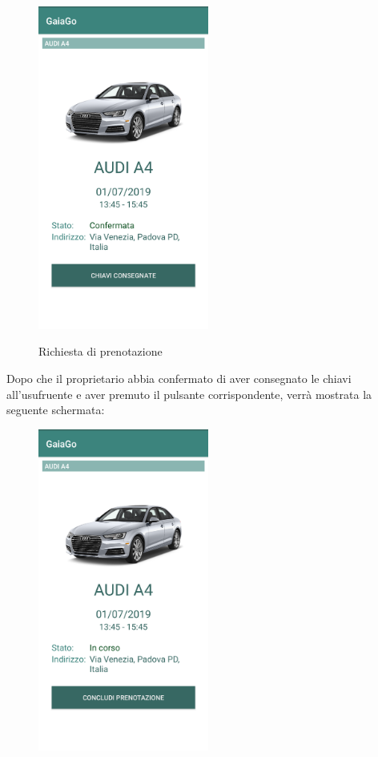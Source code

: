 \begin{itemize}
\begin{figure}[H]
		\includegraphics[width=0.5\textwidth]{res/images/chiavi_proprietario.png}\\
		\caption{Richiesta di prenotazione}
		\label{chiavi}
	\end{figure}
\pagebreak
	Dopo che il proprietario abbia confermato di aver consegnato le chiavi all'usufruente e aver premuto il pulsante corrispondente, verrà mostrata la seguente schermata:
	\begin{figure}[H] 
		\centering 
		\includegraphics[width=0.5\textwidth]{res/images/concludi_proprietario.png}\\

\end{figure}
\end{itemize}

